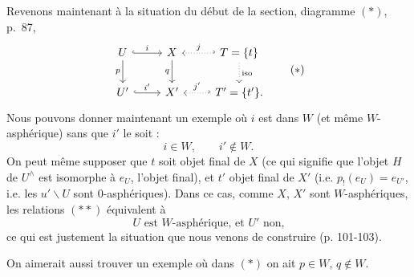 \documentclass[11pt]{article}
\newcommand{\msp}[1]{\marginpar{\footnotesize [#1]}}
\begin{document}
\msp{page 104}
Revenons maintenant à la situation du début de la section, diagramme $(*)$, p.~87,
\[
\begin{tikzcd}
U \arrow[r, hook, "i"] \arrow[d, "p"'] & X \arrow[d, "q"'] & T = \{t\} \arrow[l, hook', dotted, "j"'] \arrow[d, dotted, "\mathrm{iso}"] \\
U' \arrow[r, hook, "i'"] & X' & T' = \{t'\}. \arrow[l, hook', dotted, "j'"']
\end{tikzcd}
\tag*{$(*)$}
\]
Nous pouvons donner maintenant un exemple où $i$ est dans $W$ (et même $W$-asphérique) sans que $i'$ le soit :
\[
i \in W, \qquad i' \notin W. \tag*{$(**)$}
\]
On peut même supposer que $t$ soit objet final de $X$ (ce qui signifie que l'objet $H$ de $U^\wedge$ est isomorphe à $e_U$, l'objet final), et $t'$ objet final de $X'$ (i.e. $p_!(e_U) = e_{U'}$, i.e. les $u'\backslash U$ sont 0-asphériques). Dans ce cas, comme $X$, $X'$ sont $W$-asphériques, les relations $(**)$ équivalent à
\[
U \text{ est } W\text{-asphérique, et } U' \text{ non,} \tag*{$(***)$}
\]
ce qui est justement la situation que nous venons de construire (p. 101-103).

On aimerait aussi trouver un exemple où dans $(*)$ on ait $p \in W$, $q \notin W$.
\end{document}
